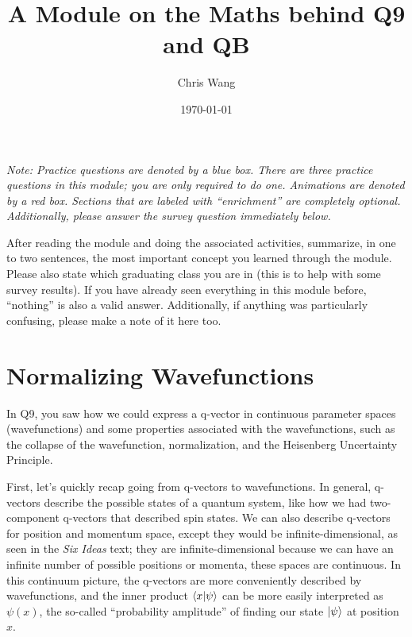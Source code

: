 \documentclass{article}
\title{A Module on the Maths behind Q9 and QB}
\author{Chris Wang}
\date{\today}
\begin{document}
\maketitle

\textit{Note: Practice questions are denoted by a blue box. There are three practice questions in this module; you are only required to do one. Animations are denoted by a red box. Sections that are labeled with ``enrichment'' are completely optional. Additionally, please answer the survey question immediately below.}

\begin{tcolorbox}[arc=2mm, colback=green!10!white, colframe=green!50!black, title=\textsc{Survey Question}]
	After reading the module and doing the associated activities, summarize, in one to two sentences, the most important concept you learned through the module. Please also state which graduating class you are in (this is to help with some survey results). If you have already seen everything in this module before, ``nothing'' is also a valid answer. Additionally, if anything was particularly confusing, please make a note of it here too.
\end{tcolorbox}

\section*{Normalizing Wavefunctions}

In Q9, you saw how we could express a q-vector in continuous parameter spaces (wavefunctions) and some properties associated with the wavefunctions, such as the collapse of the wavefunction, normalization, and the Heisenberg Uncertainty Principle. 

\vspace{1em}

First, let's quickly recap going from q-vectors to wavefunctions. In general, q-vectors describe the possible states of a quantum system, like how we had two-component q-vectors that described spin states. We can also describe q-vectors for position and momentum space, except they would be infinite-dimensional, as seen in the \textit{Six Ideas} text; they are infinite-dimensional because we can have an infinite number of possible positions or momenta, these spaces are continuous. In this continuum picture, the q-vectors are more conveniently described by wavefunctions, and the inner product $\braket{x}{\psi}$ can be more easily interpreted as $\psi(x)$, the so-called ``probability amplitude'' of finding our state $\ket{\psi}$ at position $x$.
\end{document}
